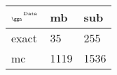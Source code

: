 \begin{tabular}{lll}
    \toprule
    $_{\text{\tiny{\ggn}}}$$^{\text{\tiny{Data}}}$ & mb & sub \\
    \midrule
    exact & 35
              & 255 \\
    mc   & 1119
              & 1536 \\
    \bottomrule
\end{tabular}